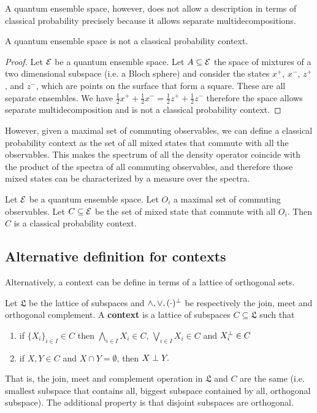 A quantum ensemble space, however, does not allow a description in terms of classical probability precisely because it allows separate multidecompositions.

\begin{prop}
	A quantum ensemble space is not a classical probability context.
\end{prop}

\begin{proof}
	Let $\mathcal{E}$ be a quantum ensemble space. Let $A \subseteq \mathcal{E}$ the space of mixtures of a two dimensional subspace (i.e. a Bloch sphere) and consider the states $x^+$, $x^-$, $z^+$, and $z^-$, which are points on the surface that form a square. These are all separate ensembles. We have $\frac{1}{2} x^+ + \frac{1}{2} x^- = \frac{1}{2} z^+ + \frac{1}{2} z^-$ therefore the space allows separate multidecomposition and is not a classical probability context.
\end{proof}

However, given a maximal set of commuting observables, we can define a classical probability context as the set of all mixed states that commute with all the observables. This makes the spectrum of all the density operator coincide with the product of the spectra of all commuting observables, and therefore those mixed states can be characterized by a measure over the spectra.

\begin{conj}
	Let $\mathcal{E}$ be a quantum ensemble space. Let $O_i$ a maximal set of commuting observables. Let $C \subseteq \mathcal{E}$ be the set of mixed state that commute with all $O_i$. Then $C$ is a classical probability context.
\end{conj}


\subsection{Alternative definition for contexts}

Alternatively, a context can be define in terms of a lattice of orthogonal sets.

\begin{defn}
	Let $\mathfrak{L}$ be the lattice of subspaces and $\wedge, \vee, (\cdot)^\perp$ be respectively the join, meet and orthogonal complement. A \textbf{context} is a lattice of subspaces $C \subseteq \mathfrak{L}$ such that
	\begin{enumerate}
		\item if $\{X_i\}_{i \in I} \in C$ then $\bigwedge_{i \in I} X_i \in C$, $\bigvee_{i \in I} X_i \in C$ and $X_i^\perp \in C$
		\item if $X, Y \in C$ and $X \cap Y = \emptyset$, then $X \perp Y.$
	\end{enumerate}
	That is, the join, meet and complement operation in $\mathfrak{L}$ and $C$ are the same (i.e. smallest subspace that contains all, biggest subspace contained by all, orthogonal subspace). The additional property is that disjoint subspaces are orthogonal.
\end{defn}

